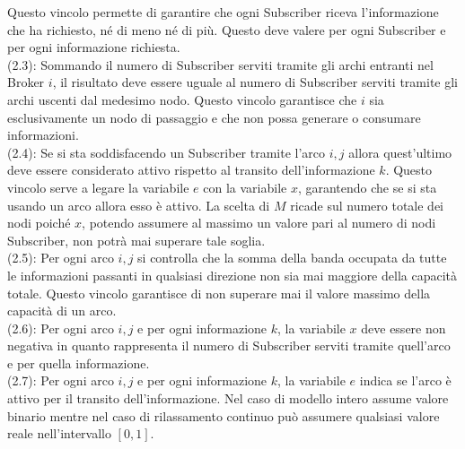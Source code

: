 \documentclass[12pt,a4paper,twoside]{report}
\begin{document}
	Questo vincolo permette di garantire che ogni Subscriber riceva l'informazione che ha richiesto, né di meno né di più. 
	Questo deve valere per ogni Subscriber e per ogni informazione richiesta.\smallskip \\
	(2.3): Sommando il numero di Subscriber serviti tramite gli archi entranti nel Broker $i$, il risultato deve essere uguale al numero di Subscriber serviti tramite gli archi uscenti dal medesimo nodo.
	Questo vincolo garantisce che $i$ sia esclusivamente un nodo di passaggio e che non possa generare o consumare informazioni.   \smallskip \\
	(2.4): Se si sta soddisfacendo un Subscriber tramite l'arco $i,j$ allora quest'ultimo deve essere considerato attivo rispetto al transito dell'informazione $k$.
	Questo vincolo serve a legare la variabile $e$ con la variabile $x$, garantendo che se si sta usando un arco allora esso è attivo. La scelta di $M$ ricade sul numero totale dei nodi poiché $x$, potendo assumere al massimo un valore pari al numero di nodi Subscriber, non potrà mai superare tale soglia.\smallskip \\
	(2.5): Per ogni arco $i,j$ si controlla che la somma della banda occupata da tutte le informazioni passanti in qualsiasi direzione non sia mai maggiore della capacità totale.
	Questo vincolo garantisce di non superare mai il valore massimo della capacità di un arco.\smallskip \\
	(2.6): Per ogni arco $i,j$ e per ogni informazione $k$, la variabile $x$ deve essere non negativa in quanto rappresenta il numero di Subscriber serviti tramite quell'arco e per quella informazione.\smallskip \\
	(2.7): Per ogni arco $i,j$ e per ogni informazione $k$, la variabile $e$ indica se l'arco è attivo per il transito dell'informazione. Nel caso di modello intero assume valore binario mentre nel caso di rilassamento continuo può assumere qualsiasi valore reale nell'intervallo $[0,1]$. 
\end{document}
